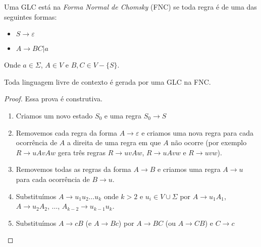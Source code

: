 \begin{example}
\begin{multicols}{2}
\begin{center}
\end{center}
  \columnbreak
\begin{center}
\end{center}
\end{multicols}

  
\end{example}

Uma GLC está na {\em Forma Normal de Chomsky} (FNC) se toda regra é de uma das seguintes formas:
\begin{itemize}
\item[] $S \to \varepsilon$
\item[] $A \to BC|a$ 
\end{itemize}

Onde $a \in \Sigma$, $A \in V$ e $B,C \in V - \{S\}$.

\begin{theorem}
  Toda linguagem livre de contexto é gerada por uma GLC na FNC.  
\end{theorem}
\begin{proof}
  Essa prova é construtiva.

\begin{enumerate}
\item Criamos um novo estado $S_0$ e uma regra $S_0 \to S$
\item Removemos cada regra da forma $A \to \varepsilon$ e criamos uma nova regra para cada ocorrência de $A$ a direita de uma regra em que $A$ não ocorre (por exemplo $R \to uAvAw$ gera três regras $R \to uvAw$, $R\to uAvw$ e $R \to uvw$).
\item Removemos todas as regras da forma $A \to B$ e criamos uma regra $A \to u$ para cada ocorrência de $B \to u$.
\item Substituímos $A \to u_1u_2 \dots u_k$ onde $k > 2$ e $u_i \in V \cup \Sigma$ por $A \to u_1A_1$, $A \to u_2A_2$, $\dots$, $A_{k-2} \to u_{k-1}u_k$.
\item Substituímos $A \to cB$ (e $A \to Bc$) por $A \to BC$ (ou $A \to CB$) e $C \to c$  
\end{enumerate}
\end{proof}

